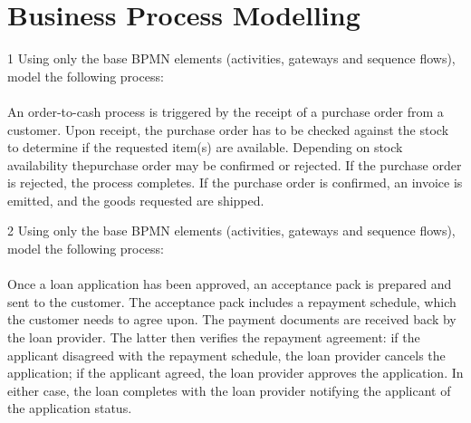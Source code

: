 \section{Business Process Modelling}
\begin{exercise}{1}
Using only the base BPMN elements (activities, gateways and sequence flows), model the following process:
\\\\An order-to-cash process is triggered by the receipt of a purchase order from a customer. 
Upon receipt, the purchase order has to be checked against the stock to determine if the requested item(s) are available.
Depending on stock availability thepurchase order may be confirmed or rejected.
If the purchase order is rejected, the process completes.
If the purchase order is confirmed, an invoice is emitted, and the goods requested are shipped.
\end{exercise}

\begin{exercise}{2}
Using only the base BPMN elements (activities, gateways and sequence flows), model the following process:
\\\\Once a loan application has been approved, an
acceptance pack is prepared and sent to the customer.
The acceptance pack includes a repayment schedule,
which the customer needs to agree upon. The payment
documents are received back by the loan provider. The
latter then verifies the repayment agreement: if the
applicant disagreed with the repayment schedule, the
loan provider cancels the application; if the applicant
agreed, the loan provider approves the application. In
either case, the loan completes with the loan provider
notifying the applicant of the application status.
\end{exercise}

